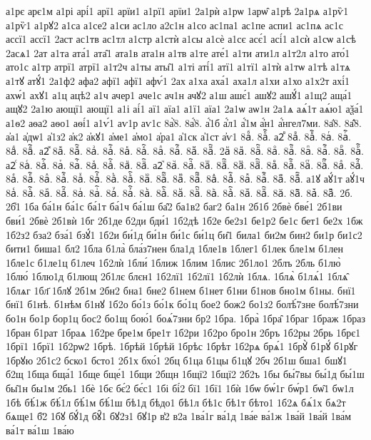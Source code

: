 {а1рє
арє1м
а1рі
арі́1
арї1
арїи1
а1рї1
арїи1
2а1рѝ
а1рѡ
1арѡ̑
а1рѣ
2а1рѧ
а1рѷ1
а1рѷ1
а1рꙋ2
а1са
а1се2
а1си
ас1ло
а2с1н
а1со
ас1па1
ас1пе
аспи1
ас1пѧ
ас1с
ассї1
ассї1
2аст
ас1тв
ас1тл
а1стр
а1стѝ
а1сы
а1сѐ
а1сє
асє́1
асі́1
а1сѝ
а1сѡ
а1сѣ
2асѧ1
2ат
а1та
ата́1
ата̑1
ата1в
ата1н
а1тв
а1те
ате́1
а1ти
ати1л
а1т2л
а1то
ато́1
ато1с
а1тр
атрї1
атрї1
а1т2ч
а1ты
аты̑1
а1ті
аті́1
атї1
а1тї1
а1тѝ
а1тѡ
а1тѣ
а1тѧ
а1тꙋ
атꙋ́1
2а1ф2
афа2
афї1
афї1
афѵ́1
2ах
а1ха
аха́1
аха1л
а1хи
а1хо
а1х2т
ахі́1
ахѡ́1
ахꙋ1
а1ц
ацѣ2
а1ч
ачер1
аче1с
ач1н
ачꙋ2
а1ш
ашє́1
ашꙋ2
ашꙋ́1
а1щ2
аща́1
ащꙋ2
2а1ю
ающї1
ающї1
а1і
аі́1
аї1
аїа1
а1ї1
аїа1
2а1ѡ
аѡ1н
2а1ѧ
аѧ́1т
аѧ́ю1
аѯа́1
а1ѳ2
аѳа2
аѳо1
аѳі́1
а1ѵ́1
аѵ1р
аѵ1с
8а҆̀8.
8а҆́8.
а҆́1б
а҆́л1
а҆́1м
а҆́н1
а҆́нгел7ми.
8а҆̈8.
8а҆̑8.
а҆а1
а҆дѡ1
а҆1з2
а҆к2
а҆кꙋ1
а҆ме1
а҆мо1
а҆ра1
а҆1ск
а҆1ст
а҆ѵ1
8аⷠ.
8аⷠ҇.
а2ⷡ
8аⷡ.
8аⷡ҇.
8аⷢ.
8аⷢ҇.
8аⷣ.
8аⷣ҇.
а2ⷤ
8аⷤ.
8аⷤ҇.
8аⷥ.
8аⷥ҇.
8аⷦ.
8аⷦ҇.
8аⷧ.
8аⷧ҇.
8аⷨ.
8аⷨ҇.
2аⷩ
8аⷩ.
8аⷩ҇.
8аⷪ.
8аⷪ҇.
8аⷫ.
8аⷫ҇.
8аⷬ.
8аⷬ҇.
а2ⷭ
8аⷭ.
8аⷭ҇.
8аⷮ.
8аⷮ҇.
8аⷯ.
8аⷯ҇.
8аⷰ.
8аⷰ҇.
а2ⷱ
8аⷱ.
8аⷱ҇.
8аⷲ.
8аⷲ҇.
8аⷳ.
8аⷳ҇.
8аⷴ.
8аⷴ҇.
8аⷵ.
8аⷵ҇.
8аⷶ.
8аⷶ҇.
8аⷷ.
8аⷷ҇.
8аⷸ.
8аⷸ҇.
8аⷹ.
8аⷹ҇.
8аⷺ.
8аⷺ҇.
8аⷻ.
8аⷻ҇.
8аⷼ.
8аⷼ҇.
8аⷽ.
8аⷽ҇.
8аⷾ.
8аⷾ҇.
8аⷿ.
8аⷿ҇.
а1ꙋ
аꙋ́1т
аꙋ́1ч
8аꙴ.
8аꙴ҇.
8аꙵ.
8аꙵ҇.
8аꙶ.
8аꙶ҇.
8аꙷ.
8аꙷ҇.
8аꙸ.
8аꙸ҇.
8аꙹ.
8аꙹ҇.
8аꙺ.
8аꙺ҇.
8аꙻ.
8аꙻ҇.
8а꙼.
8а꙼҇.
8а꙽.
8а꙽҇.
2б.
2б̾1
1ба
ба́1н
ба́1с
ба́1т
ба́1ч
ба́1ш
ба̑2
ба1в2
баг2
ба1н
2б1б
2бвѐ
бве́1
2б1ви
бви́1
2бвѐ
2б1вѝ
1бг
2б1де
б2ди
бди́1
1б2дѣ
1б2е
бе2з1
бе1р2
бе1с
бет1
бе2х
1бж
1б2з2
бза2
бза́1
бзꙋ́1
1б2и
би́1д
би́1н
би́1с
би́1ц
би̑1
била1
би2м
бин2
би1р
би1с2
бити1
биша1
бл2
1бла
б1ла̀
бла́з7нен
бла1д
1бле1в
1блег1
б1лек
бле1м
б1лен
1бле1с
б1ле1ц
б1леч
1б2лѝ
1бли́
1ближ
1блим
1блис
2б1ло1
2блъ
2бль
б1лю̀
1блю́
1блю1д
б1лющ
2б1лє
блєн1
1б2лї1
1б2лї1
1б2лѝ
1блѧ.
1блѧ̀
б1лѧ́1
1блѧ̑
1блѧг
1бл҃
1блꙋ
2б1м
2бн2
бна1
бне2
б1нем
б1нет
б1ни
б1нов
бно1м
б1ны.
бнї1
бнї1
б1нѣ.
б1нѣм
б1нꙋ
1б2о
бо́1з
бо́1к
бо́1ц
бое2
бож2
бо1з2
болѣ́7зне
болѣ́7зни
бо1н
бо1р
бор1ц
бос2
бо1щ
бою́1
боѧ́7зни
бр2
1бра.
1бра̀
1бра̑
1браг
1браж
1браз
1бран
б1рат
1браѧ
1б2ре
бре1м
бре1т
1б2ри
1б2ро
бро1н
2бръ
1б2ры
2брь
1брє1
1брї1
1брї1
1б2рѡ2
1брѣ.
1брѣй
1брѣй
1брѣс
1брѣт
1б2рѧ
брѧ́1
1брꙋ̀
б1рꙋ́
б1рꙋг
1брꙋю
2б1с2
бско1
бсто1
2б1х
бхо́1
2бц
б1ца
б1цы
б1цꙋ
2бч
2б1ш
бша1
бшꙋ1
б2щ
1бща
бща́1
1бще
бще́1
1бщи
2бщн
1бщї2
1бщї2
2б2ъ
1бы
бы́7вы
бы́1д
бы́1ш
бы̑1н
бы1м
2бь1
1бѐ
1бє
бє́2
бє́с1
1бі
бі́2
бї1
1бї1
1бѝ
1бѡ
бѡ́1г
бѡ́р1
бѡ̑1
бѡ1л
1бѣ
бѣ́1ж
бѣ́1л
бѣ́1м
бѣ́1ш
бѣ1д
бѣдо1
бѣ1л
бѣ1с
бѣ1т
бѣто1
1б2ѧ
бѧ́1х
бѧ2т
бѧще1
б҃2
1бꙋ
бꙋ́1д
бꙋ̑1
бꙋ2з1
бꙋ1р
в̾2
в2а
1ва́1г
ва́1д
1ва́е
ва́1ж
1ва́й
1ва́й
1ва́м
ва́1т
ва́1ш
1ва́ю
}
